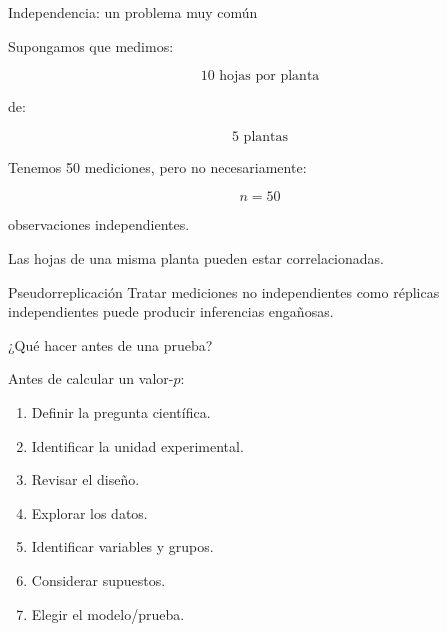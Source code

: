 \begin{frame}{Independencia: un problema muy común}

Supongamos que medimos:

\[
10\text{ hojas por planta}
\]

de:

\[
5\text{ plantas}
\]

Tenemos 50 mediciones, pero no necesariamente:

\[
n=50
\]

observaciones independientes.

Las hojas de una misma planta pueden estar correlacionadas.

\begin{alertblock}{Pseudorreplicación}
Tratar mediciones no independientes como réplicas independientes
puede producir inferencias engañosas.
\end{alertblock}

\end{frame}

\begin{frame}{¿Qué hacer antes de una prueba?}

Antes de calcular un valor-$p$:

\begin{enumerate}
    \item Definir la pregunta científica.
    \item Identificar la unidad experimental.
    \item Revisar el diseño.
    \item Explorar los datos.
    \item Identificar variables y grupos.
    \item Considerar supuestos.
    \item Elegir el modelo/prueba.
\end{enumerate}

\end{frame}

